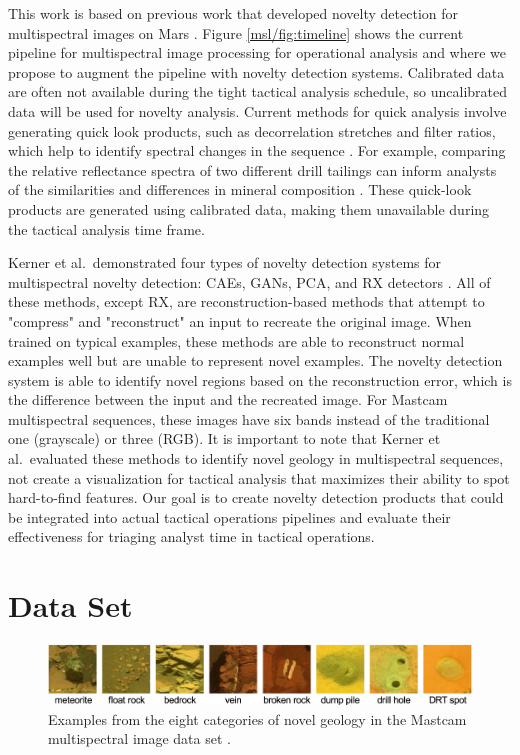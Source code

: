 This work is based on previous work that developed novelty detection for multispectral images on Mars \parencite{kerner2020comparison}.
Figure \ref{msl/fig:timeline} shows the current pipeline for multispectral image processing for operational analysis and where we propose to augment the pipeline with novelty detection systems. 
Calibrated data are often not available during the tight tactical analysis schedule, so uncalibrated data will be used for novelty analysis. 
Current methods for quick analysis involve generating quick look products, such as decorrelation stretches and filter ratios, which help to identify spectral changes in the sequence \parencite{gillespie1986color}.
For example, comparing the relative reflectance spectra of two different drill tailings can inform analysts of the similarities and differences in mineral composition \parencite{wellington2017visible}.
These quick-look products are generated using calibrated data, making them unavailable during the tactical analysis time frame.  

Kerner et al.~demonstrated four types of novelty detection systems for multispectral novelty detection: CAEs, GANs, PCA, and RX detectors \parencite{kerner2020comparison}. 
All of these methods, except RX, are reconstruction-based methods that attempt to "compress" and "reconstruct" an input to recreate the original image. 
When trained on typical examples, these methods are able to reconstruct normal examples well but are unable to represent novel examples.
The novelty detection system is able to identify novel regions based on the reconstruction error, which is the difference between the input and the recreated image.
For Mastcam multispectral sequences, these images have six bands instead of the traditional one (grayscale) or three (RGB). 
It is important to note that Kerner et al.~evaluated these methods to identify novel geology in multispectral sequences, not create a visualization for tactical analysis that maximizes their ability to spot hard-to-find features. 
Our goal is to create novelty detection products that could be integrated into actual tactical operations pipelines and evaluate their effectiveness for triaging analyst time in tactical operations.

\section{Data Set}
\begin{figure}
\centering
\includegraphics[width=\linewidth]{figs/msl/categories.png}
\caption[Novel Geology Categories for Mastcam Multispectral Images]{Examples from the eight categories of novel geology in the Mastcam multispectral image data set \protect\parencite{kerner_data}.}
\label{msl/fig:NovelCategories}
\end{figure}


